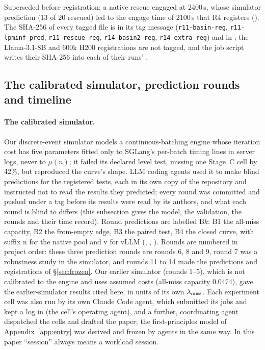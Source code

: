 \noindent Superseded before registration: a native rescue engaged at 2400\,s, whose simulator prediction (13 of 20 rescued) led to the engage time of 2100\,s that R4 registers (). The SHA-256 of every tagged file is in its tag message (\texttt{r11-basin-reg}, \texttt{r11-lpminf-pred}, \texttt{r11-rescue-reg}, \texttt{r14-basin2-reg}, \texttt{r14-extra-reg}) and in ; the Llama-3.1-8B and 600k H200 registrations are not tagged, and the job script writes their SHA-256 into each of their runs' .

\subsection{The calibrated simulator, prediction rounds and timeline}\label{app:timeline}

\paragraph{The calibrated simulator.}\label{sec:sim}
Our discrete-event simulator models a continuous-batching engine whose iteration cost has five parameters fitted only to SGLang's per-batch timing lines in server logs, never to $\mu(n)$; it failed its declared level test, missing one Stage~C cell by 42\%, but reproduced the curve's shape. LLM coding agents used it to make blind predictions for the registered tests, each in its own copy of the repository and instructed not to read the results they predicted; every round was committed and pushed under a tag before its results were read by its authors, and what each round is blind to differs (this subsection gives the model, the validation, the rounds and their time record). Round predictions are labelled B$k$: B1 the all-miss capacity, B2 the from-empty edge, B3 the paired test, B4 the closed curve, with suffix n for the native pool and v for vLLM (, , ). Rounds are numbered in project order: these three prediction rounds are rounds 6, 8 and 9, round 7 was a robustness study in the simulator, and rounds 11 to 14 made the predictions and registrations of \S\ref{sec:frozen}. Our earlier simulator (rounds 1--5), which is not calibrated to the engine and uses assumed costs (all-miss capacity 0.0474\sps), gave the earlier-simulator results cited here, in units of its own $\lambda_{\mathrm{miss}}$. Each experiment cell was also run by its own Claude Code agent, which submitted its jobs and kept a log in  (the cell's operating agent), and a further, coordinating agent dispatched the cells and drafted the paper; the first-principles model of Appendix~\ref{app:entry} was derived and frozen by agents in the same way. In this paper ``session'' always means a workload session.

